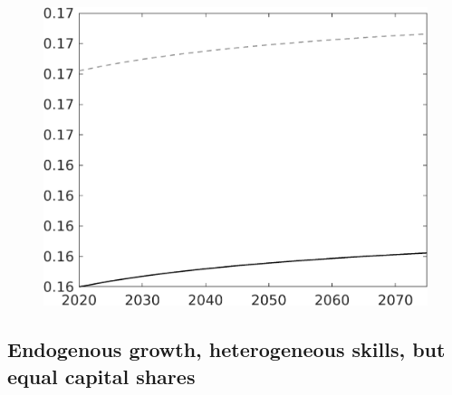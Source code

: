 \documentclass[12pt]{article}
\begin{document}
\begin{figure}[h!!]
\begin{minipage}[]{0.32\textwidth}
	\end{minipage}	
	\begin{minipage}[]{0.32\textwidth}
		\includegraphics[width=1\textwidth]{../../codding_model/own_basedOnFried/optimalPol_010922_revision/figures/all_13Sept22/CompTaul_Equlab_LFBAU_Reg0_Ln_spillover0_nsk0_xgr1_knspil0_sep1_countec0_GovRev0_etaa0.79_lgd0.png}
	\end{minipage}	
\end{figure}

\clearpage \newpage
\subsection{Endogenous growth, heterogeneous skills, but equal capital shares}
\end{document}
